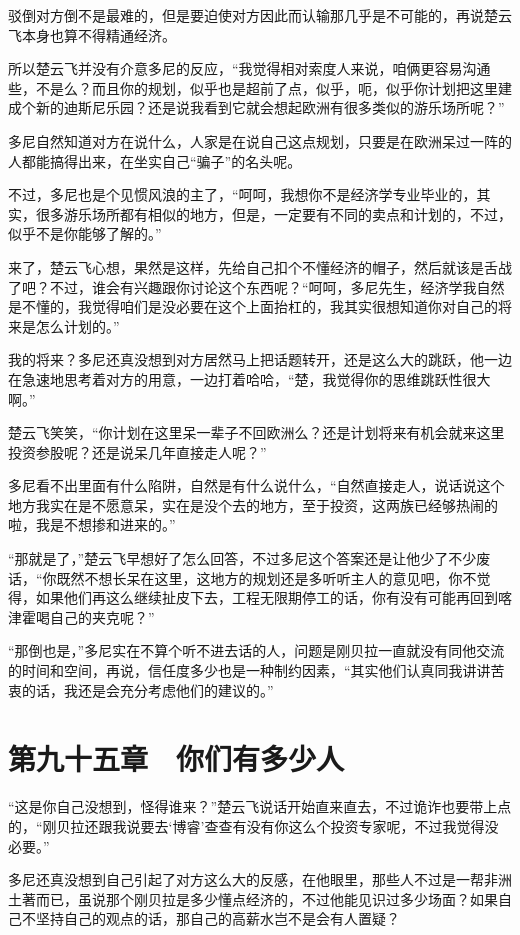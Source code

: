 驳倒对方倒不是最难的，但是要迫使对方因此而认输那几乎是不可能的，再说楚云飞本身也算不得精通经济。

所以楚云飞并没有介意多尼的反应，“我觉得相对索度人来说，咱俩更容易沟通些，不是么？而且你的规划，似乎也是超前了点，似乎，呃，似乎你计划把这里建成个新的迪斯尼乐园？还是说我看到它就会想起欧洲有很多类似的游乐场所呢？”

多尼自然知道对方在说什么，人家是在说自己这点规划，只要是在欧洲呆过一阵的人都能搞得出来，在坐实自己“骗子”的名头呢。

不过，多尼也是个见惯风浪的主了，“呵呵，我想你不是经济学专业毕业的，其实，很多游乐场所都有相似的地方，但是，一定要有不同的卖点和计划的，不过，似乎不是你能够了解的。”

来了，楚云飞心想，果然是这样，先给自己扣个不懂经济的帽子，然后就该是舌战了吧？不过，谁会有兴趣跟你讨论这个东西呢？“呵呵，多尼先生，经济学我自然是不懂的，我觉得咱们是没必要在这个上面抬杠的，我其实很想知道你对自己的将来是怎么计划的。”

我的将来？多尼还真没想到对方居然马上把话题转开，还是这么大的跳跃，他一边在急速地思考着对方的用意，一边打着哈哈，“楚，我觉得你的思维跳跃性很大啊。”

楚云飞笑笑，“你计划在这里呆一辈子不回欧洲么？还是计划将来有机会就来这里投资参股呢？还是说呆几年直接走人呢？”

多尼看不出里面有什么陷阱，自然是有什么说什么，“自然直接走人，说话说这个地方我实在是不愿意呆，实在是没个去的地方，至于投资，这两族已经够热闹的啦，我是不想掺和进来的。”

“那就是了，”楚云飞早想好了怎么回答，不过多尼这个答案还是让他少了不少废话，“你既然不想长呆在这里，这地方的规划还是多听听主人的意见吧，你不觉得，如果他们再这么继续扯皮下去，工程无限期停工的话，你有没有可能再回到喀津霍喝自己的夹克呢？”

“那倒也是，”多尼实在不算个听不进去话的人，问题是刚贝拉一直就没有同他交流的时间和空间，再说，信任度多少也是一种制约因素，“其实他们认真同我讲讲苦衷的话，我还是会充分考虑他们的建议的。”

\section{第九十五章　你们有多少人}

“这是你自己没想到，怪得谁来？”楚云飞说话开始直来直去，不过诡诈也要带上点的，“刚贝拉还跟我说要去‘博睿’查查有没有你这么个投资专家呢，不过我觉得没必要。”

多尼还真没想到自己引起了对方这么大的反感，在他眼里，那些人不过是一帮非洲土著而已，虽说那个刚贝拉是多少懂点经济的，不过他能见识过多少场面？如果自己不坚持自己的观点的话，那自己的高薪水岂不是会有人置疑？

